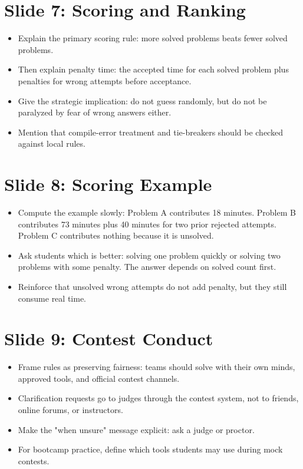 \documentclass[11pt]{article}
\begin{document}
\section*{Slide 7: Scoring and Ranking}
\begin{itemize}
  \item Explain the primary scoring rule: more solved problems beats fewer solved problems.
  \item Then explain penalty time: the accepted time for each solved problem plus penalties for wrong attempts before acceptance.
  \item Give the strategic implication: do not guess randomly, but do not be paralyzed by fear of wrong answers either.
  \item Mention that compile-error treatment and tie-breakers should be checked against local rules.
\end{itemize}

\section*{Slide 8: Scoring Example}
\begin{itemize}
  \item Compute the example slowly: Problem A contributes 18 minutes. Problem B contributes 73 minutes plus 40 minutes for two prior rejected attempts. Problem C contributes nothing because it is unsolved.
  \item Ask students which is better: solving one problem quickly or solving two problems with some penalty. The answer depends on solved count first.
  \item Reinforce that unsolved wrong attempts do not add penalty, but they still consume real time.
\end{itemize}

\section*{Slide 9: Contest Conduct}
\begin{itemize}
  \item Frame rules as preserving fairness: teams should solve with their own minds, approved tools, and official contest channels.
  \item Clarification requests go to judges through the contest system, not to friends, online forums, or instructors.
  \item Make the "when unsure" message explicit: ask a judge or proctor.
  \item For bootcamp practice, define which tools students may use during mock contests.
\end{itemize}
\end{document}
